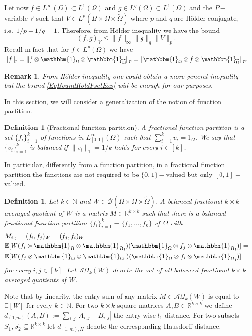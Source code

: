 \documentclass[11pt]{article}
\newtheorem{definition}[theorem]{Definition}
\newtheorem{remark}[theorem]{Remark}
\def\R{\mathbb{R}}
\def\E{\mathbb{E}}
\begin{document}
Let now $f\in L^{\infty}(\Omega)\subset L^{1}(\Omega)$ and $g\in L^{q}(\Omega)\subset L^{1}(\Omega)$ and the $P-$variable $V$ such that $V\in L^p(\Omega\times \Omega\times \widetilde\Omega)$ where $p$ and $q$ are H\"older conjugate, i.e.\ $1/p+1/q=1.$ Therefore, from H\"older inequality we have the bound
\begin{equation}\label{EqBoundHoldPsetExp}
(f,g)_V \leq \|f\|_\infty\|g\|_q \|V\|_{p}. 
\end{equation}
Recall in fact that for $f\in L^p(\Omega)$ we have $\|f\|_p=\|f \otimes\mathbbm{1}_{\Omega} \otimes \mathbbm{1}_{\widetilde\Omega}\|_p=\|\mathbbm{1}_{\Omega}\otimes f\otimes \mathbbm{1}_{\widetilde\Omega}\|_p.$
\begin{remark}
From H\"older inequality one could obtain a more general inequality but the bound \eqref{EqBoundHoldPsetExp} will be enough for our purposes. 
\end{remark}

In this section, we will consider a generalization of the notion of function partition.

\begin{definition}[Fractional function partition]
A fractional function partition is a set $\{f_i\}_{i=1}^k$ of functions in $L^\infty_{[0,1]}(\Omega)$ such that $\sum_{i=1}^k v_i=1_\Omega$. We say that $\{v_i\}_{i=1}^k$ is balanced if $\|v_i\|_1=1/k$ holds for every $i\in [k]$.
\end{definition}
In particular, differently from a function partition, in a fractional function partition the functions are not required to be $\{0,1\}-$valued but only $[0,1]-$valued.


\begin{definition}Let $k\in\mathbb{N}$ and $W\in\mathcal{B}(\Omega\times \Omega \times \widetilde \Omega)$. A balanced fractional $k\times k$ averaged quotient of $W$ is a matrix $M\in\mathbb{R}^{k\times k}$ such that there is a balanced fractional function partition $\{f_i\}_{i=1}^k=\{f_1,\ldots,f_k\}$ of  $\Omega$ with $$\begin{aligned}
    &M_{i,j}=(f_i,f_j)_W=(f_j,f_i)_W=\\
    &\mathbb{E}[W (f_i\otimes \mathbbm{1}_{\Omega}\otimes \mathbbm{1}_{\Omega_1}) (\mathbbm{1}_{\Omega}\otimes f_j \otimes \mathbbm{1}_{\Omega_1})]=\\
    &\mathbb{E}[W (f_j\otimes \mathbbm{1}_{\Omega}\otimes \mathbbm{1}_{\Omega_1}) (\mathbbm{1}_{\Omega}\otimes f_i \otimes \mathbbm{1}_{\Omega_1})]
    \end{aligned}$$
for every $i,j\in [k]$. Let $\mathcal{AQ}_{k}(W)$ denote the set of all balanced fractional $k\times k$ averaged quotients of $W$.
\end{definition}
Note that by linearity, the entry sum of any matrix $M\in\mathcal{AQ}_k(W)$ is equal to $\E[W]$ for every $k\in\mathbb{N}$.
For two $k\times k$ square matrices $A,B\in \R^{k \times k}$ we define $d_{(1,m)}(A,B):=\sum_{i,j}|A_{i,j}-B_{i,j}|$ the entry-wise $l_1$ distance. For two subsets $S_1,S_2\subseteq \mathbb{R}^{k\times k}$ let $d_{{(1,m)},H}$ denote the corresponding Hausdorff distance. 
\end{document}
